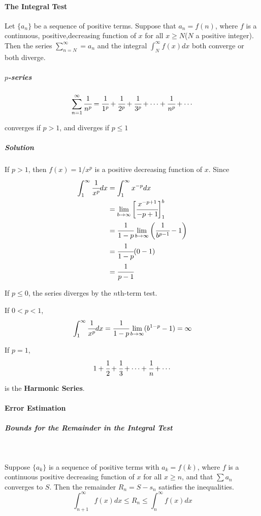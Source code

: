 \documentclass{article}
\begin{document}
            \paragraph{The Integral Test}
            Let $\{a_n\}$ be a sequence of positive terms. Suppose that $a_n=f(n)$, where $f$ is a continuous, positive,decreasing function of $x$ for all $x\ge N$($N$ a positive integer). Then the series $\sum_{n=N}^\infty =a_n$ and the integral $\int_N^\infty f(x)dx$ both converge or both diverge. 
                \subparagraph{$p$-series}
                    \[\sum_{n=1}^\infty \cfrac{1}{n^p}=\cfrac{1}{1^p}+\cfrac{1}{2^p}+\cfrac{1}{3^p}+\cdots+\cfrac{1}{n^p}+\cdots\]
                    \par converges if $p>1$, and diverges if $p\le 1$
                \subparagraph{Solution}
                If $p>1$, then $f(x)=1/x^p$ is a positive decreasing function of $x$. Since
                \begin{equation}
                    \begin{aligned}
                        \int_1^\infty\cfrac{1}{x^p}dx&=\int_1^\infty x^{-p}dx\\
                        &=\lim\limits_{b\to\infty}\bigg[\cfrac{x^{-p+1}}{-p+1}\bigg]_1^b\\
                        &=\cfrac{1}{1-p}\lim\limits_{b\to\infty}\bigg(\cfrac{1}{b^{p-1}}-1\bigg)\\
                        &=\cfrac{1}{1-p}(0-1)\\
                        &=\cfrac{1}{p-1}\\
                    \end{aligned}
                \end{equation}
                \par If $p\le 0$, the series diverges by the $n$th-term test.
                \par If $0<p<1$,
                \[\int_1^\infty \cfrac{1}{x^p}dx=\cfrac{1}{1-p}\lim\limits_{b\to\infty}(b^{1-p}-1)=\infty\]
                \par If $p=1$,
                \[1+\cfrac{1}{2}+\cfrac{1}{3}+\cdots+\cfrac{1}{n}+\cdots\]
                \par is the \textbf{Harmonic Series}.
            \paragraph{Error Estimation}
                \subparagraph{Bounds for the Remainder in the Integral Test}
                \text{}\\
                \par Suppose $\{a_k\}$ is a sequence of positive terms with $a_k=f(k)$, where $f$ is a continuous positive decreasing function of $x$ for all $x\ge n$, and that $\sum a_n$ converges to $S$. Then the remainder $R_n=S-s_n$ satisfies the inequalities.
                \[\int_{n+1}^\infty f(x)dx\le R_n\le \int_n^\infty f(x) dx\]
\end{document}
